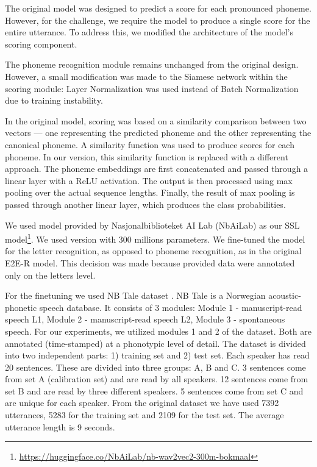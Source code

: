 \documentclass{article}
\begin{document}
The original model was designed to predict a score for each pronounced phoneme. However, for the challenge, we require the model to produce a single score for the entire utterance. To address this, we modified the architecture of the model’s scoring component.

The phoneme recognition module remains unchanged from the original design. However, a small modification was made to the Siamese network within the scoring module: Layer Normalization was used instead of Batch Normalization due to training instability.

In the original model, scoring was based on a similarity comparison between two vectors --- one representing the predicted phoneme and the other representing the canonical phoneme. A similarity function was used to produce scores for each phoneme.
In our version, this similarity function is replaced with a different approach. The phoneme embeddings are first concatenated and passed through a linear layer with a ReLU activation. The output is then processed using max pooling over the actual sequence lengths. Finally, the result of max pooling is passed through another linear layer, which produces the class probabilities.

We used model provided by Nasjonalbiblioteket AI Lab (NbAiLab) as our SSL model\footnote{\url{https://huggingface.co/NbAiLab/nb-wav2vec2-300m-bokmaal}}. We used version with 300 millions parameters. We fine-tuned the model for the letter recognition, as opposed to phoneme recognition, as in the original E2E-R model. 
This decision was made because provided data were annotated only on the letters level.

For the finetuning we used NB Tale dataset \cite{nbtale2013}. NB Tale is a Norwegian acoustic-phonetic speech database. It consists of 3 modules: Module 1 - manuscript-read speech L1, Module 2 - manuscript-read speech L2, Module 3 - spontaneous speech. For our experiments, we utilized modules 1 and 2 of the dataset. Both are annotated (time-stamped) at a phonotypic level of detail. The dataset is divided into two independent parts: 1) training set and 2) test set. Each speaker has read 20 sentences. These are divided into three groups: A, B and C. 3 sentences come from set A (calibration set) and are read by all speakers. 12 sentences come from set B and are read by three different speakers. 5 sentences come from set C and are unique for each speaker. From the original dataset we have used 7392 utterances, 5283 for the training set and 2109 for the test set. The average utterance length is 9 seconds.
\end{document}

